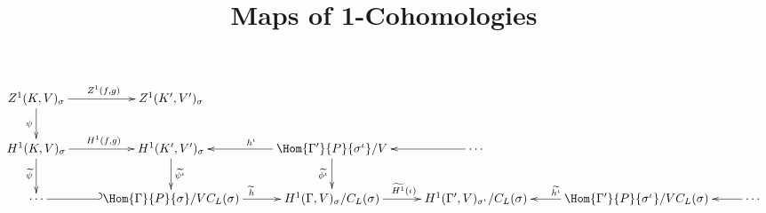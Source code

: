 \documentclass[12pt, a4paper]{amsart}
\begin{document}
\title{Maps of 1-Cohomologies}
\maketitle
\begin{displaymath}
\xymatrix{
Z^1(K, V)_\sigma \ar[d]_{\psi} \ar[r]^{Z^1(f, g)}             & Z^1(K', V')_{\sigma} \\
H^1(K, V)_\sigma \ar[d]_{\widetilde{\psi}} \ar[r]^{H^1(f, g)} & H^1(K', V')_{\sigma} \ar[d]^{\widetilde{\psi^\iota}} & \Hom{\Gamma'}{P}{\sigma^\iota}/V \ar[l]_{h^\iota} \ar[d]_{\widetilde{\phi^\iota}} & \cdots \ar@{->}[l] \\
\cdots & \ar@{_{(}-}[l] \Hom{\Gamma}{P}{\sigma}/VC_L(\sigma) \ar[r]^{\widetilde{h}} & H^1(\Gamma, V)_\sigma/C_L(\sigma) \ar[r]^{\widetilde{H^1}(\iota)} & H^1(\Gamma', V)_{\sigma^\iota}/C_L(\sigma) & \Hom{\Gamma'}{P}{\sigma^\iota}/VC_L(\sigma) \ar[l]_{\widetilde{h^\iota}} & \cdots \ar@{->}[l] \\
}
\end{displaymath}
\end{document}
